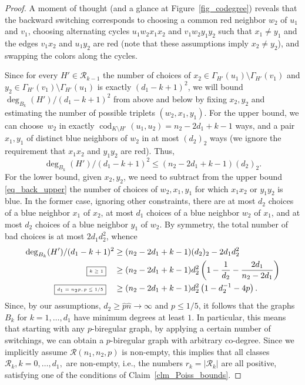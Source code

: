 \documentclass[12pt,reqno]{amsart}
\newcommand{\rc}{{\mathcal{R}}}
\newcommand{\rcnnp}{\rc(n_1,n_2,p)}
\newcommand{\cod}{\operatorname{cod}}
\theoremstyle{definition}
\newcommand{\justify}[1]{\fbox{\tiny{#1}}\quad}
\begin{document}
\begin{proof}
 A moment of thought (and a glance at Figure~\ref{fig_codegree}) reveals that the backward switching corresponds to choosing a common red neighbor $w_2$ of $u_1$ and $v_1$, choosing alternating cycles $u_1w_2x_1x_2$ and $v_1w_2y_1y_2$ such that $x_1 \neq y_1$ and the edges $v_1x_2$ and $u_1y_2$ are red (note that these  assumptions  imply $x_2 \neq y_2$), and swapping the colors along the cycles.

 Since for every $H' \in \rc_{k-1}$ the number of choices of $x_2 \in \Gamma_{H'}(u_1) \setminus \Gamma_{H'}(v_1)$ and $ y_2 \in \Gamma_{H'}(v_1) \setminus \Gamma_{H'}(u_1)$ is exactly $(d_1 - k + 1)^2$, we will bound $\deg_{B_k}(H')/(d_1 - k + 1)^2$ from above and below by fixing $x_2, y_2$ and estimating the number of possible triplets $(w_2, x_1,y_1)$.
 For the upper bound, we can choose~$w_2$ in exactly $\cod_{K \setminus H'}(u_1,u_2) = n_2 - 2d_1 + k - 1$ ways, and a pair $x_1, y_1$ of distinct blue neighbors of $w_2$ in at most $(d_2)_2$ ways (we ignore the requirement that $x_1x_2$ and $y_1y_2$ are red). Thus,
 \begin{equation}
   \label{eq_back_upper}
   \deg_{B_k}(H')/(d_1 - k + 1)^2 \le (n_2 - 2d_1 + k - 1)(d_2)_2.
 \end{equation}
 For the lower bound, given $x_2, y_2$, we need to subtract from the upper bound \eqref{eq_back_upper} the number of choices of $w_2, x_1, y_1$ for which $x_1x_2$ or $y_1y_2$ is blue. In the former case, ignoring other constraints, there are at most $d_2$ choices of a blue  neighbor $x_1$ of $x_2$, at most $d_1$ choices of a blue neighbor $w_2$ of $x_1$, and at most $d_2$ choices of a blue neighbor $y_1$ of $w_2$. By symmetry, the total number of bad choices is at most $2d_1d_2^2$, whence
\begin{align*}
  \deg_{B_k}(H')/(d_1 - k + 1)^2 &\ge (n_2 - 2d_1 + k - 1)(d_2)_2 - 2d_1d_2^2 \\
  \justify{$k \ge 1$}	&\ge (n_2 - 2d_1 + k - 1)d_2^2\left( 1 - \frac{1}{d_2} - \frac{2d_1}{n_2 - 2d_1} \right) \\
  \justify{$d_1 = n_2p, p \le 1/5$} &\ge (n_2 - 2d_1 + k - 1)d_2^2\left( 1- d_2^{-1} - 4p \right).
\end{align*}
Since, by our assumptions, $d_2 \ge \hat p\hat n  \to \infty$  and $p \le 1/5$, it follows that the graphs $B_k$ for $k = 1, \dots, d_1$ have minimum degrees at least $1$. In particular, this means that starting with any $p$-biregular graph, by applying a certain number of switchings, we can obtain a $p$-biregular graph with arbitrary co-degree. Since we implicitly assume $\rcnnp$ is non-empty, this implies that all classes $\rc_k, k = 0, \dots, d_1,$ are non-empty, i.e., the numbers $r_k = |\rc_k|$ are all positive, satisfying one of the conditions of Claim~\ref{clm_Poiss_bounds}.


\end{proof}
\end{document}
